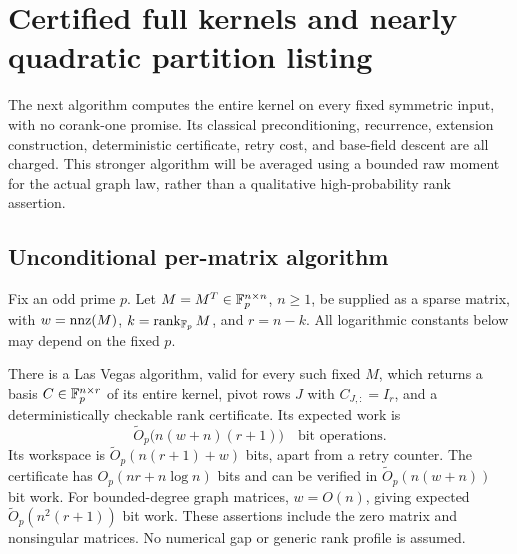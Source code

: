 \section{Certified full kernels and nearly quadratic partition listing}\label{sec:full-kernel}
The next algorithm computes the entire kernel on every fixed symmetric
input, with no corank-one promise. Its classical preconditioning,
recurrence, extension construction, deterministic certificate, retry
cost, and base-field descent are all charged. This stronger algorithm
will be averaged using a bounded raw moment for the actual graph law,
rather than a qualitative high-probability rank assertion.

\subsection{Unconditional per-matrix algorithm}
Fix an odd prime $p$. Let $M=M^T\in\mathbb F_p^{n\times n}$, $n\ge1$,
be supplied as a sparse matrix, with $w=\operatorname{nnz}(M)$,
$k=\operatorname{rank}_{\mathbb F_p}M$, and $r=n-k$.
All logarithmic constants below may depend on the fixed $p$.

\begin{theorem}\label{fk:thm:kernel}
There is a Las Vegas algorithm, valid for every such fixed $M$,
which returns a basis $C\in\mathbb F_p^{n\times r}$ of its entire kernel,
pivot rows $J$ with $C_{J,:}=I_r$, and a deterministically checkable
rank certificate. Its expected work is
\[
 \widetilde O_p\bigl(n(w+n)(r+1)\bigr)
 \quad\text{bit operations}.
\]
Its workspace is $\widetilde O_p(n(r+1)+w)$ bits, apart from a retry
counter. The certificate has $O_p(nr+n\log n)$ bits and can be
verified in $\widetilde O_p(n(w+n))$ bit work.
For bounded-degree graph matrices, $w=O(n)$, giving expected
$\widetilde O_p(n^2(r+1))$ bit work. These assertions include the
zero matrix and nonsingular matrices. No numerical gap or generic
rank profile is assumed.
\end{theorem}

